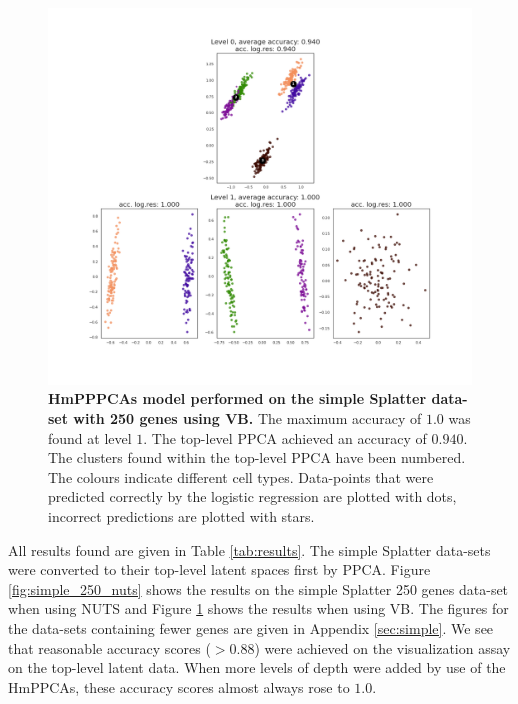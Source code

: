 \begin{figure}
    \centering
    \includegraphics[width=\linewidth]{figs/simple_250_vb.png}
    \caption[HmPPPCAs model performed on the simple Splatter data-set with 250 genes using VB]{\small \textbf{HmPPPCAs model performed on the simple Splatter data-set with 250 genes using VB.} \small The maximum accuracy of $1.0$ was found at level $1$. The top-level PPCA achieved an accuracy of $0.940$. The clusters found within the top-level PPCA have been numbered. The colours indicate different cell types. Data-points that were predicted correctly by the logistic regression are plotted with dots, incorrect predictions are plotted with stars.}
    \label{fig:simple_250_vb}
\end{figure}

All results found are given in Table \ref{tab:results}. The simple Splatter data-sets were converted to their top-level latent spaces first by PPCA. Figure \ref{fig:simple_250_nuts} shows the results on the simple Splatter 250 genes data-set when using NUTS and Figure \ref{fig:simple_250_vb} shows the results when using VB. The figures for the data-sets containing fewer genes are given in Appendix \ref{sec:simple}. We see that reasonable accuracy scores ($>0.88$) were achieved on the visualization assay on the top-level latent data. When more levels of depth were added by use of the HmPPCAs, these accuracy scores almost always rose to $1.0$.


